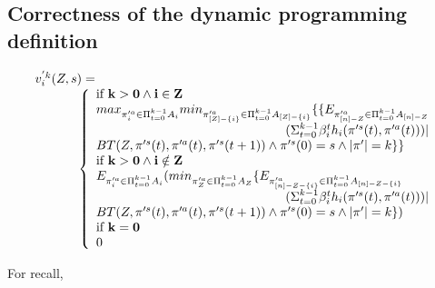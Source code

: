\subsection{Correctness of the dynamic programming definition}
%
%
\[
\begin{array}{l}
v_i^{'k}(Z,s)=\\
\hspace{1.2cm} \left\{
\begin{array}{l}
{\bf \text{if } k > 0 \wedge i \in Z} \\
max_{\pi'^{a}_{i} \in \Pi_{t=0}^{k-1} A_{i}}
min_{\pi'^{a}_{[Z]-\{i\}} \in \Pi_{t=0}^{k-1} A_{[Z]-\{i\}}}
\{\{E_{\pi'^{a}_{[n]-Z} \in \Pi_{t=0}^{k-1} A_{[n]-Z}}\\ \hfill(\Sigma_{t=0}^{k-1} \beta_i^{t}h_{i}(\pi'^{s}(t),\pi'^{a}(t))) |\\ BT(Z,\pi'^{s}(t),\pi'^{a}(t),\pi'^{s}(t+1)) \wedge \pi'^{s}(0)=s \wedge |\pi'|=k\}\}\\
{\bf \text{if } k > 0 \wedge i \notin Z}  \\
E_{\pi'^{a}_{i} \in \Pi_{t=0}^{k-1} A_{i}}
(min_{\pi'^{a}_{Z} \in \Pi_{t=0}^{k-1} A_{Z}}
\{E_{\pi'^{a}_{[n]-Z-\{i\}} \in \Pi_{t=0}^{k-1} A_{[n]-Z-\{i\}}}\\ \hfill
(\Sigma_{t=0}^{k-1} \beta_i^{t}h_{i}(\pi'^{s}(t),\pi'^{a}(t))) |\\ BT(Z,\pi'^{s}(t),\pi'^{a}(t),\pi'^{s}(t+1)) \wedge \pi'^{s}(0)=s \wedge |\pi'|=k\})\\
{\bf \text{if } k = 0}  \\0
\end{array}
\right.
\end{array}
\]

For recall,

